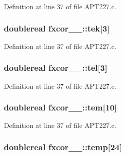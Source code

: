 Definition at line 37 of file A\+P\+T227.\+c.

\subsubsection[{\texorpdfstring{tek}{tek}}]{\setlength{\rightskip}{0pt plus 5cm}doublereal fxcor\+\_\+\_\+\+::tek\mbox{[}3\mbox{]}}\hypertarget{structfxcor__1___a88ef825748aad2b5604de31d2dc8fba6}{}\label{structfxcor__1___a88ef825748aad2b5604de31d2dc8fba6}


Definition at line 37 of file A\+P\+T227.\+c.

\subsubsection[{\texorpdfstring{tel}{tel}}]{\setlength{\rightskip}{0pt plus 5cm}doublereal fxcor\+\_\+\_\+\+::tel\mbox{[}3\mbox{]}}\hypertarget{structfxcor__1___a0efc371454ee71d50a98d5e9493072dd}{}\label{structfxcor__1___a0efc371454ee71d50a98d5e9493072dd}


Definition at line 37 of file A\+P\+T227.\+c.

\subsubsection[{\texorpdfstring{tem}{tem}}]{\setlength{\rightskip}{0pt plus 5cm}doublereal fxcor\+\_\+\_\+\+::tem\mbox{[}10\mbox{]}}\hypertarget{structfxcor__1___a31bd80b8cdb91061d6effcd14820d5df}{}\label{structfxcor__1___a31bd80b8cdb91061d6effcd14820d5df}


Definition at line 37 of file A\+P\+T227.\+c.

\subsubsection[{\texorpdfstring{temp}{temp}}]{\setlength{\rightskip}{0pt plus 5cm}doublereal fxcor\+\_\+\_\+\+::temp\mbox{[}24\mbox{]}}\hypertarget{structfxcor__1___a0a7f67f7045034aaf5364362a3dbaa87}{}\label{structfxcor__1___a0a7f67f7045034aaf5364362a3dbaa87}


